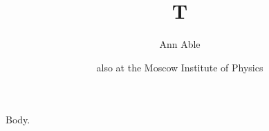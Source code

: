 \documentclass{article}
\begin{document}
\title{T}
\author{Ann Able \and also at the Moscow Institute of Physics}
\maketitle
Body.
\end{document}
